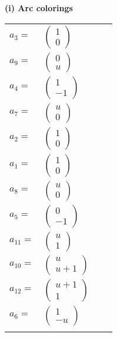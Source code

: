 \documentclass[1p]{elsarticle_modified}
\theoremstyle{definition}
\begin{document}
\flushleft \textbf{(i) Arc colorings}\\
\begin{tabular}{m{7pt} m{180pt} m{7pt} m{180pt} }
\flushright $a_{3}=$&$\begin{pmatrix}1\\0\end{pmatrix}$ \\
\flushright $a_{9}=$&$\begin{pmatrix}0\\u\end{pmatrix}$ \\
\flushright $a_{4}=$&$\begin{pmatrix}1\\-1\end{pmatrix}$ \\
\flushright $a_{7}=$&$\begin{pmatrix}u\\0\end{pmatrix}$ \\
\flushright $a_{2}=$&$\begin{pmatrix}1\\0\end{pmatrix}$ \\
\flushright $a_{1}=$&$\begin{pmatrix}1\\0\end{pmatrix}$ \\
\flushright $a_{8}=$&$\begin{pmatrix}u\\0\end{pmatrix}$ \\
\flushright $a_{5}=$&$\begin{pmatrix}0\\-1\end{pmatrix}$ \\
\flushright $a_{11}=$&$\begin{pmatrix}u\\1\end{pmatrix}$ \\
\flushright $a_{10}=$&$\begin{pmatrix}u\\u+1\end{pmatrix}$ \\
\flushright $a_{12}=$&$\begin{pmatrix}u+1\\1\end{pmatrix}$ \\
\flushright $a_{6}=$&$\begin{pmatrix}1\\- u\end{pmatrix}$\\&\end{tabular}
\end{document}
